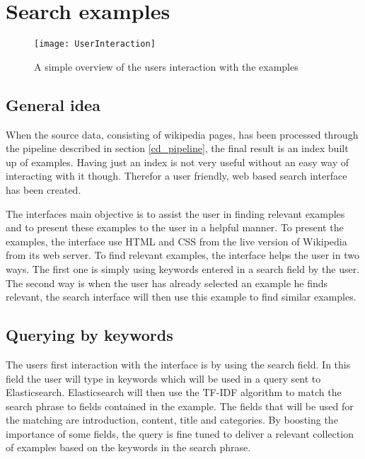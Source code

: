 \section{Search examples}

\begin{figure}[h]
\caption{A simple overview of the users interaction with the examples}
\texttt{[image: UserInteraction]}
\end{figure}

\subsection{General idea}
When the source data, consisting of wikipedia pages, has been processed through the pipeline described in section \ref{cd_pipeline}, the final result is an index built up of examples. Having just an index is not very useful without an easy way of interacting with it though. Therefor a user friendly, web based search interface has been created. 

The interfaces main objective is to assist the user in finding relevant examples and to present these examples to the user in a helpful manner. To present the examples, the interface use HTML and CSS from the live version of Wikipedia from its web server. To find relevant examples, the interface helps the user in two ways. The first one is simply using keywords entered in a search field by the user. The second way is when the user has already selected an example he finds relevant, the search interface will then use this example to find similar examples.

\subsection{Querying by keywords}

The users first interaction with the interface is by using the search field. In this field the user will type in keywords which will be used in a query sent to Elasticsearch. Elasticsearch will then use the TF-IDF algorithm to match the search phrase to fields contained in the example. The fields that will be used for the matching are introduction, content, title and categories. By boosting the importance of some fields, the query is fine tuned to deliver a relevant collection of examples based on the keywords in the search phrase.


